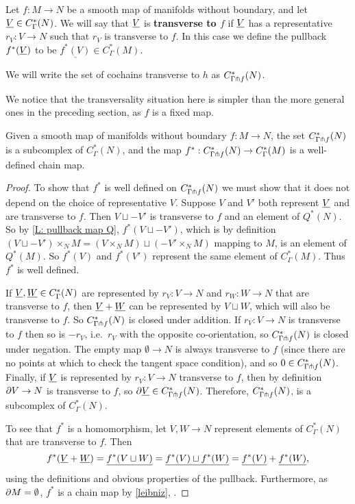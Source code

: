 \begin{definition}\label{D: transverse to map}
	Let $f \colon M \to N$ be a smooth map of manifolds without boundary, and let $\underline{V} \in C^*_\Gamma(N)$.
	We will say that $\underline{V}$ is \textbf{transverse to $f$} if $\underline{V}$ has a representative $r_V \colon V \to N$ such that $r_V$ is transverse to $f$.
	In this case we define the pullback $f^*(\underline{V})$ to be $\underline{f^*(V)} \in C^*_\Gamma(M)$.

	We will write the set of cochains transverse to $h$ as $C^*_{\Gamma \pitchfork f}(N)$.
\end{definition}

We notice that the transversality situation here is simpler than the more general ones in the preceding section, as $f$ is a fixed map.

\begin{proposition}
	Given a smooth map of manifolds without boundary $f \colon M \to N$, the set $C^*_{\Gamma \pitchfork f}(N)$ is a subcomplex of $C^*_{\Gamma}(N)$, and the map $f^*:C^*_{\Gamma \pitchfork f}(N) \to C^*_{\Gamma}(M)$ is a well-defined chain map.
\end{proposition}

\begin{proof}
	To show that $f^*$ is well defined on $C^*_{\Gamma \pitchfork f}(N)$ we must show that it does not depend on the choice of representative $V$.
	Suppose $V$ and $V'$ both represent $\underline{V}$ and are transverse to $f$.
	Then $V \sqcup -V'$ is transverse to $f$ and an element of $Q^*(N)$.
	So by \cref{L: pullback map Q}, $f^*(V \sqcup -V')$, which is by definition $(V \sqcup -V') \times_N M = (V \times_N M) \sqcup (-V' \times_N M)$ mapping to $M$, is an element of $Q^*(M)$.
	So $f^*(V)$ and $f^*(V')$ represent the same element of $C^*_{\Gamma}(M)$.
	Thus $f^*$ is well defined.

	If $\underline{V},\underline{W} \in C^*_\Gamma(N)$ are represented by $r_V \colon V \to N$ and $r_W \colon W \to N$ that are transverse to $f$, then $\underline{V}+\underline{W}$ can be represented by $V \sqcup W$, which will also be transverse to $f$.
	So $C^*_{\Gamma \pitchfork f}(N)$ is closed under addition.
	If $r_V \colon V \to N$ is transverse to $f$ then so is $-r_V$, i.e.\ $r_V$ with the opposite co-orientation, so $C^*_{\Gamma \pitchfork f}(N)$ is closed under negation.
	The empty map $\emptyset \to N$ is always transverse to $f$ (since there are no points at which to check the tangent space condition), and so $0 \in C^*_{\Gamma \pitchfork f}(N)$.
	Finally, if $\underline{V}$ is represented by $r_V \colon V \to N$ transverse to $f$, then by definition $\partial V \to N$ is transverse to $f$, so $\partial \underline{V} \in C^*_{\Gamma \pitchfork f}(N)$.
	Therefore, $C^*_{\Gamma \pitchfork f}(N)$, is a subcomplex of $C^*_{\Gamma}(N)$.

	To see that $f^*$ is a homomorphism, let $V,W \to N$ represent elements of $C^*_{\Gamma}(N)$ that are transverse to $f$.
	Then
	$$f^*(\underline{V}+\underline{W}) = \underline{f^*(V \sqcup W)} = \underline{f^*(V) \sqcup f^*(W)} = \underline{f^*(V)}+\underline{f^*(W)},$$
	using the definitions and obvious properties of the pullback.
	Furthermore, as $\partial M = \emptyset$, $f^*$ is a chain map by \cref{leibniz}, .
\end{proof}

